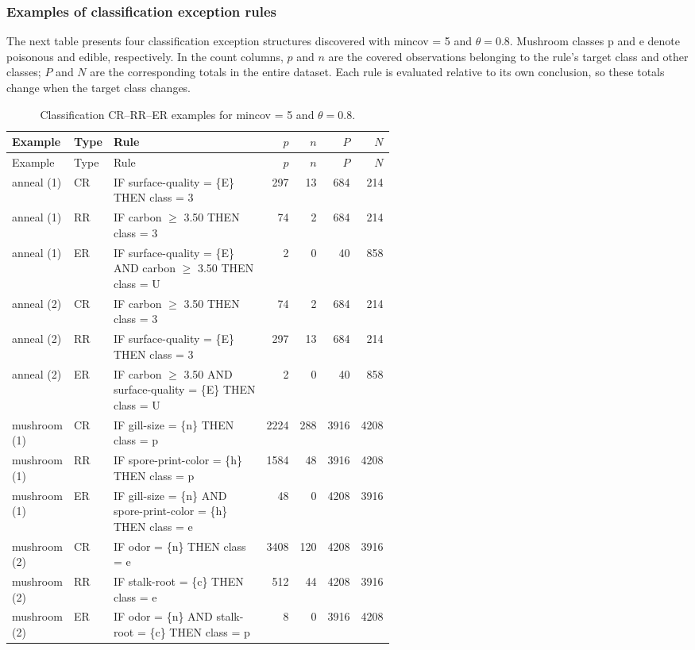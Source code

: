 \subsubsection{Examples of classification exception rules}
\label{classification-rule-examples}
The next table presents four classification exception structures
discovered with mincov = 5 and $\theta=0.8$.  Mushroom classes p and e
denote poisonous and edible, respectively. In the count columns, $p$ and $n$ are
the covered observations belonging to the rule's target class and other classes;
$P$ and $N$ are the corresponding totals in the entire dataset. Each rule is
evaluated relative to its own conclusion, so these totals change when the
target class changes.

\begingroup
\footnotesize
\setlength{\tabcolsep}{3pt}
\begin{longtable}{@{}>{\raggedright\arraybackslash}p{0.13\linewidth}l>{\raggedright\arraybackslash}p{0.43\linewidth}rrrr@{}}
\caption{Classification CR--RR--ER examples for mincov = 5 and $\theta=0.8$.}
\label{tab:classification-rule-examples}\\
\toprule
Example & Type & Rule & $p$ & $n$ & $P$ & $N$ \\
\midrule
\endfirsthead
\toprule
Example & Type & Rule & $p$ & $n$ & $P$ & $N$ \\
\midrule
\endhead
anneal (1) & CR & IF surface-quality = \{E\} THEN class = 3 & 297 & 13 & 684 & 214 \\
anneal (1) & RR & IF carbon $\geq$ 3.50 THEN class = 3 & 74 & 2 & 684 & 214 \\
anneal (1) & ER & IF surface-quality = \{E\} AND carbon $\geq$ 3.50 THEN class = U & 2 & 0 & 40 & 858 \\
\addlinespace
anneal (2) & CR & IF carbon $\geq$ 3.50 THEN class = 3 & 74 & 2 & 684 & 214 \\
anneal (2) & RR & IF surface-quality = \{E\} THEN class = 3 & 297 & 13 & 684 & 214 \\
anneal (2) & ER & IF carbon $\geq$ 3.50 AND surface-quality = \{E\} THEN class = U & 2 & 0 & 40 & 858 \\
\addlinespace
mushroom (1) & CR & IF gill-size = \{n\} THEN class = p & 2224 & 288 & 3916 & 4208 \\
mushroom (1) & RR & IF spore-print-color = \{h\} THEN class = p & 1584 & 48 & 3916 & 4208 \\
mushroom (1) & ER & IF gill-size = \{n\} AND spore-print-color = \{h\} THEN class = e & 48 & 0 & 4208 & 3916 \\
\addlinespace
mushroom (2) & CR & IF odor = \{n\} THEN class = e & 3408 & 120 & 4208 & 3916 \\
mushroom (2) & RR & IF stalk-root = \{c\} THEN class = e & 512 & 44 & 4208 & 3916 \\
mushroom (2) & ER & IF odor = \{n\} AND stalk-root = \{c\} THEN class = p & 8 & 0 & 3916 & 4208 \\
\bottomrule
\end{longtable}
\endgroup

